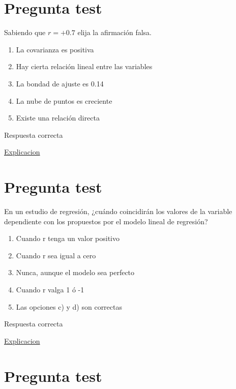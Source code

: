 \documentclass[
]{book}
\providecommand{\tightlist}{%
  \setlength{\itemsep}{0pt}\setlength{\parskip}{0pt}}
\begin{document}
\hypertarget{pregunta-test-129}{%
\section{Pregunta test}\label{pregunta-test-129}}

Sabiendo que \(r=+0.7\) elija la afirmación falsa.

\begin{enumerate}
\def\labelenumi{\alph{enumi})}
\tightlist
\item
  La covarianza es positiva
\item
  Hay cierta relación lineal entre las variables
\item
  La bondad de ajuste es 0.14
\item
  La nube de puntos es creciente
\item
  Existe una relación directa
\end{enumerate}

Respuesta correcta

\href{https://blog.minitab.com/es/analisis-de-regresion-como-puedo-interpretar-el-r-cuadrado-y-evaluar-la-bondad-de-ajuste}{Explicacion}

\hypertarget{pregunta-test-130}{%
\section{Pregunta test}\label{pregunta-test-130}}

En un estudio de regresión, ¿cuándo coincidirán los valores de la variable dependiente con los propuestos por el modelo lineal de regresión?

\begin{enumerate}
\def\labelenumi{\alph{enumi})}
\tightlist
\item
  Cuando r tenga un valor positivo
\item
  Cuando r sea igual a cero
\item
  Nunca, aunque el modelo sea perfecto
\item
  Cuando r valga 1 ó -1
\item
  Las opciones c) y d) son correctas
\end{enumerate}

Respuesta correcta

\href{https://1fjmanzano.github.io/bioestadistica/relaci\%C3\%B3n-entre-variables-nume\%CC\%81ricas.html\#coeficiente-de-correlacio\%CC\%81n}{Explicacion}

\hypertarget{pregunta-test-131}{%
\section{Pregunta test}\label{pregunta-test-131}}
\end{document}
